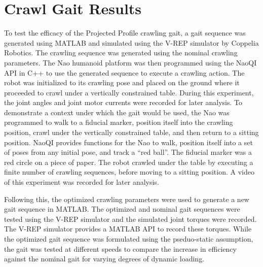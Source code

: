 \chapter{Crawl Gait Results} \label{ch:results_crawl_gait}


To test the efficacy of the Projected Profile crawling gait, a gait sequence was generated
using MATLAB and simulated using the V-REP simulator by Coppelia Robotics.
The crawling sequence was generated using the nominal crawling parameters. 
The Nao humanoid platform was then programmed using the NaoQI API in C++ to use the generated sequence 
to execute a crawling action. The robot was initialized to its crawling pose and placed on the 
ground where it proceeded to crawl under a vertically constrained table. 
During this experiment, the joint angles and joint motor 
currents were recorded for later analysis.
To demonstrate a context under which the gait 
would be used, the Nao was programmed to walk to a fiducial marker, position itself into
the crawling position, crawl under the vertically constrained table, and then return to a sitting position.
NaoQI provides functions for the Nao to walk, position itself into a set of poses from any initial
pose, and track a ``red ball''. The fiducial marker was a red circle on a piece of paper.
The robot crawled under the table by executing a finite number of crawling sequences, before
moving to a sitting position. A video of this experiment was recorded for later analysis.

Following this, the optimized crawling parameters were used to generate a new gait sequence in
MATLAB. The optimized and nominal gait sequences were tested using the V-REP simulator and the simulated
joint torques were recorded. The V-REP simulator provides a MATLAB API to record these torques.
While the optimized gait sequence was formulated using the pseduo-static assumption,
the gait was tested at different speeds to compare the increase in efficiency against the nominal
gait for varying degrees of dynamic loading.

